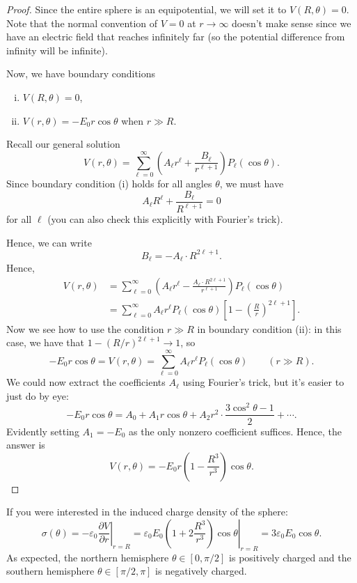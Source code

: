 \begin{proof}
Since the entire sphere is an equipotential, we will set it to $V(R,\theta)=0$. Note that the normal convention of $V=0$ at $r\to\infty$ doesn't make sense since we have an electric field that reaches infinitely far (so the potential difference from infinity will be infinite).

Now, we have boundary conditions
\begin{enumerate}[(i)]
    \item $V(R,\theta)=0$,
    \item $V(r,\theta)=-E_0r\cos\theta$ when $r\gg R$.
\end{enumerate}
Recall our general solution
\[V(r,\theta)=\sum_{\ell=0}^\infty\left(A_\ell r^\ell+\frac{B_\ell}{r^{\ell+1}}\right)P_\ell(\cos\theta).\]
Since boundary condition (i) holds for all angles $\theta$, we must have
\[A_\ell R^\ell+\frac{B_\ell}{R^{\ell+1}}=0\]
for all $\ell$ (you can also check this explicitly with Fourier's trick).

Hence, we can write
\[B_\ell=-A_\ell\cdot R^{2\ell+1}.\]
Hence,
\begin{align*}
V(r,\theta)&=\sum_{\ell=0}^\infty\left(A_\ell r^\ell-\frac{A_\ell\cdot R^{2\ell+1}}{r^{\ell+1}}\right)P_\ell(\cos\theta)\\
&=\sum_{\ell=0}^\infty A_\ell r^\ell P_\ell(\cos\theta)\left[1-\left(\frac{R}{r}\right)^{2\ell+1}\right].
\end{align*}
Now we see how to use the condition $r\gg R$ in boundary condition (ii): in this case, we have that $1-(R/r)^{2\ell+1}\to 1$, so
\[-E_0r\cos\theta=V(r,\theta)=\sum_{\ell=0}^\infty A_\ell r^\ell P_\ell(\cos\theta)\qquad(r\gg R).\]
We could now extract the coefficients $A_\ell$ using Fourier's trick, but it's easier to just do by eye:
\[-E_0r\cos\theta=A_0+A_1r\cos\theta+A_2r^2\cdot\frac{3\cos^2\theta-1}{2}+\cdots.\]
Evidently setting $A_1=-E_0$ as the only nonzero coefficient suffices. Hence, the answer is
\[\boxed{V(r,\theta)=-E_0r\left(1-\frac{R^3}{r^3}\right)\cos\theta}.\]
\end{proof}

\begin{remark}
If you were interested in the induced charge density of the sphere:
\[\sigma(\theta)=-\varepsilon_0\left.\frac{\partial V}{\partial r}\right\rvert_{r=R}=\varepsilon_0E_0\left.\left(1+2\frac{R^3}{r^3}\right)\cos\theta\right\rvert_{r=R}=3\varepsilon_0E_0\cos\theta.\]
As expected, the northern hemisphere $\theta\in[0,\pi/2]$ is positively charged and the southern hemisphere $\theta\in[\pi/2,\pi]$ is negatively charged.
\end{remark}

